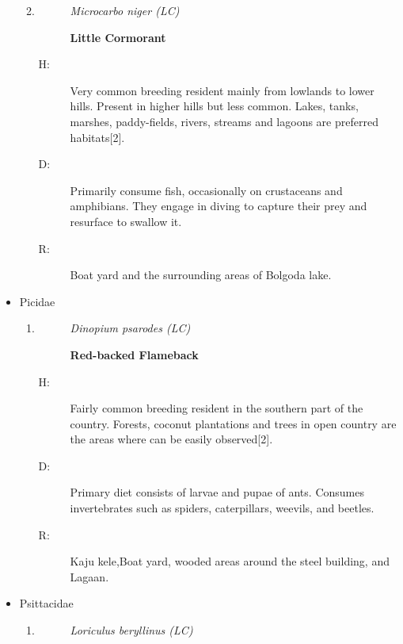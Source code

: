 \begin{itemize}
\begin{enumerate}
\begin{description}
\end{description}%
\item%
\begin{description}%
\item[]%
\textit{Microcarbo niger (LC)}%
\item[]%
\textbf{Little Cormorant}%
\end{description}%
\begin{description}%
\item[H: ]%
Very common breeding resident mainly from lowlands to lower hills. Present in higher hills but less common. Lakes, tanks, marshes, paddy-fields, rivers, streams and lagoons are preferred habitats{[}2{]}.%
\item[D: ]%
Primarily consume fish, occasionally on crustaceans and amphibians. They engage in diving to capture their prey and resurface to swallow it.%
\item[R: ]%
Boat yard and the surrounding areas of Bolgoda lake.%
\end{description}%
\end{enumerate}%
\item%
Picidae%
\begin{enumerate}%
\item%
\begin{description}%
\item[]%
\textit{Dinopium psarodes (LC)}%
\item[]%
\textbf{Red{-}backed Flameback}%
\end{description}%
\begin{description}%
\item[H: ]%
Fairly common breeding resident in the southern part of the country. Forests, coconut plantations and trees in open country are the areas where can be easily observed{[}2{]}.%
\item[D: ]%
Primary diet consists of larvae and pupae of ants. Consumes invertebrates such as spiders, caterpillars, weevils, and beetles.%
\item[R: ]%
Kaju kele,Boat yard, wooded areas around the steel building, and Lagaan.%
\end{description}%
\end{enumerate}%
\item%
Psittacidae%
\begin{enumerate}%
\item%
\begin{description}%
\item[]%
\textit{Loriculus beryllinus (LC)}%
\item[]%

\end{description}
\end{enumerate}
\end{itemize}
